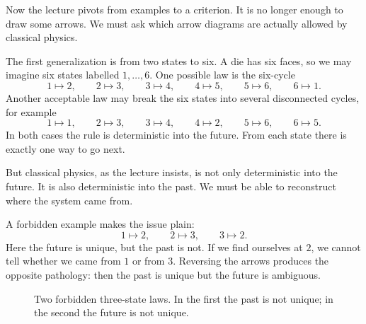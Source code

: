 Now the lecture pivots from examples to a criterion. It is no longer enough to draw some arrows. We must ask which arrow diagrams are actually allowed by classical physics.

The first generalization is from two states to six. A die has six faces, so we may imagine six states labelled \(1,\dots,6\). One possible law is the six-cycle
\begin{equation}
1\mapsto2,\qquad
2\mapsto3,\qquad
3\mapsto4,\qquad
4\mapsto5,\qquad
5\mapsto6,\qquad
6\mapsto1.
\end{equation}
Another acceptable law may break the six states into several disconnected cycles, for example
\begin{equation}
1\mapsto1,\qquad
2\mapsto3,\qquad
3\mapsto4,\qquad
4\mapsto2,\qquad
5\mapsto6,\qquad
6\mapsto5.
\end{equation}
In both cases the rule is deterministic into the future. From each state there is exactly one way to go next.

But classical physics, as the lecture insists, is not only deterministic into the future. It is also deterministic into the past. We must be able to reconstruct where the system came from.

A forbidden example makes the issue plain:
\[
1\mapsto2,\qquad 2\mapsto3,\qquad 3\mapsto2.
\]
Here the future is unique, but the past is not. If we find ourselves at \(2\), we cannot tell whether we came from \(1\) or from \(3\). Reversing the arrows produces the opposite pathology: then the past is unique but the future is ambiguous.

\begin{figure}[htbp]
\centering
{}
\caption{Two forbidden three-state laws. In the first the past is not unique; in the second the future is not unique.}
\end{figure}

